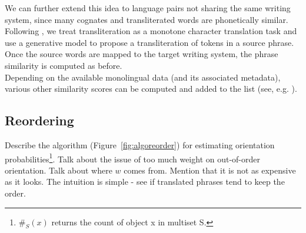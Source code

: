 \documentclass[11pt]{article}
\newcommand{\mnote}[1]{\marginpar{%
  \vskip-\baselineskip
  \raggedright\footnotesize
  \itshape\hrule\smallskip\tiny{#1}\par\smallskip\hrule}}
\newcommand{\mtodo}[1]{\mnote{\textcolor{red}{#1}}}
\newcommand{\figref}[1]{Figure~\ref{#1}}
\begin{document}
We can further extend this idea to language pairs not sharing the same writing system, since many cognates and transliterated words are phonetically similar.  Following \cite{Virga:2003,Irvine:2010a}, we treat transliteration as a monotone character translation task and use a generative model\mtodo{Argue that enough training data is easy to get} to propose a transliteration of tokens in a source phrase.  Once the source words are mapped to the target writing system, the phrase similarity is computed as before.\\

Depending on the available monolingual data (and its associated metadata), various other similarity scores can be computed and added to the list (see, e.g. \cite{Schafer:2002}).

\subsection{Reordering} \label{sect:order}

Describe the algorithm (\figref{fig:algoreorder}) for estimating orientation probabilities\footnote{$\#_{S}(x)$ returns the count of object x in multiset S.}.  Talk about the issue of too much weight on out-of-order orientation.  Talk about where $w$ comes from.  Mention that it is not as expensive as it looks.  The intuition is simple - see if translated phrases tend to keep the order.

\end{document}
